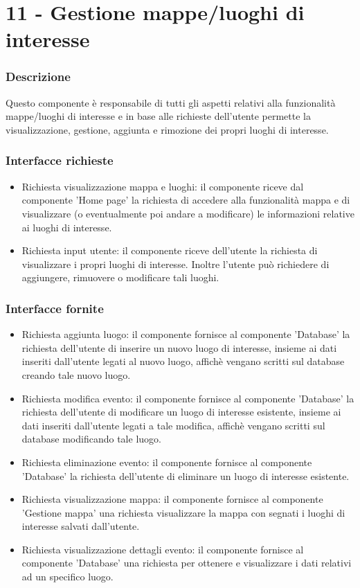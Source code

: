 \documentclass[a4paper,12pt]{article}
\begin{document}
\section*{11 -  Gestione mappe/luoghi di interesse}
\subsubsection*{Descrizione}
Questo componente è responsabile di tutti gli aspetti relativi alla funzionalità mappe/luoghi di interesse e in base alle richieste dell'utente permette la visualizzazione, gestione, aggiunta e rimozione dei propri luoghi di interesse.
\subsubsection*{Interfacce richieste}
\begin{itemize} \setlength\itemsep{0.01em}
\item {\sffamily Richiesta visualizzazione mappa e luoghi}: il componente riceve dal componente 'Home page'  la richiesta di accedere alla funzionalità mappa e di visualizzare (o eventualmente poi andare a modificare) le informazioni relative ai luoghi di interesse.
\item {\sffamily Richiesta input utente}: il componente riceve dell'utente la richiesta di visualizzare i propri luoghi di interesse. Inoltre l'utente può richiedere di aggiungere, rimuovere o modificare tali luoghi.

\end{itemize}

\subsubsection*{Interfacce fornite}
\begin{itemize} \setlength\itemsep{0.01em}
\item {\sffamily Richiesta aggiunta luogo}: il componente fornisce al componente 'Database' la richiesta dell'utente di inserire un nuovo luogo di interesse, insieme ai dati inseriti dall'utente legati al nuovo luogo, affichè vengano scritti sul database creando tale nuovo luogo.
\item {\sffamily Richiesta modifica evento}: il componente fornisce al componente 'Database'  la richiesta dell'utente di modificare un luogo di interesse esistente, insieme ai dati inseriti dall'utente legati a tale modifica, affichè vengano scritti sul database modificando tale luogo.
\item {\sffamily Richiesta eliminazione evento}: il componente fornisce al componente 'Database'  la richiesta dell'utente di eliminare un luogo di interesse esistente.
\item {\sffamily Richiesta visualizzazione mappa}: il componente fornisce al componente 'Gestione mappa' una richiesta visualizzare la mappa con segnati i luoghi di interesse salvati dall'utente.
\item {\sffamily Richiesta visualizzazione dettagli evento}: il componente fornisce al componente 'Database' una richiesta per ottenere e visualizzare i dati relativi ad un specifico luogo.
\end{itemize}
\end{document}
